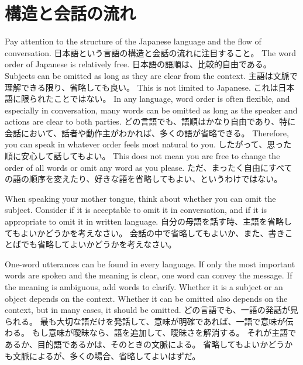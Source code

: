 \documentclass[uplatex,dvipdfmx,b5paper,english,10pt]{jsbook}
\begin{document}
\section{構造と会話の流れ}
\fi

\ifEnglish
Pay attention to the structure of the Japanese language and the flow of conversation.
\else
日本語という言語の構造と会話の流れに注目すること。
\fi
\ifEnglish
The word order of Japanese is relatively free.
\else
日本語の語順は、比較的自由である。
\fi
\ifEnglish
Subjects can be omitted as long as they are clear from the context.
\else
主語は文脈で理解できる限り、省略しても良い。
\fi
\ifEnglish
This is not limited to Japanese.
\else
これは日本語に限られたことではない。
\fi
\ifEnglish
In any language, word order is often flexible, and especially in conversation, many words can be omitted as long as the speaker and actions are clear to both parties.
\else
どの言語でも、語順はかなり自由であり、特に会話において、話者や動作主がわかれば、多くの語が省略できる。
\fi
\ifEnglish
Therefore, you can speak in whatever order feels most natural to you.
\else
したがって、思った順に安心して話してもよい。
\fi
\ifEnglish
This does not mean you are free to change the order of all words or omit any word as you please.
\else
ただ、まったく自由にすべての語の順序を変えたり、好きな語を省略してもよい、というわけではない。
\fi

\begin{toiquestion}
\ifEnglish
When speaking your mother tongue, think about whether you can omit the subject.
Consider if it is acceptable to omit it in conversation, and if it is appropriate to omit it in written language.
\else
自分の母語を話す時、主語を省略してもよいかどうかを考えなさい。
会話の中で省略してもよいか、また、書きことばでも省略してよいかどうかを考えなさい。
\fi
\end{toiquestion}

\begin{toianswer}
\ifEnglish
One-word utterances can be found in every language.
If only the most important words are spoken and the meaning is clear, one word can convey the message.
If the meaning is ambiguous, add words to clarify.
Whether it is a subject or an object depends on the context.
Whether it can be omitted also depends on the context, but in many cases, it should be omitted.
\else
どの言語でも、一語の発話が見られる。
最も大切な語だけを発話して、意味が明確であれば、一語で意味が伝わる。
もし意味が曖昧なら、語を追加して、曖昧さを解消する。
それが主語であるか、目的語であるかは、そのときの文脈による。
省略してもよいかどうかも文脈によるが、多くの場合、省略してよいはずだ。
\fi
\end{toianswer}
\end{document}
